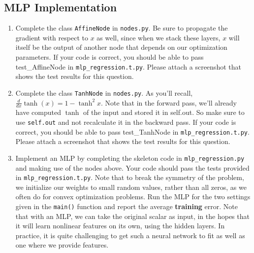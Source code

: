 \documentclass{article}
\theoremstyle{plain}
\theoremstyle{definition}
\begin{document}
\subsection{MLP Implementation}
\begin{enumerate}
\setcounter{enumi}{\value{saveenum}}
\item Complete the class \texttt{AffineNode} in \texttt{nodes.py}. Be sure
to propagate the gradient with respect to $x$ as well, since when
we stack these layers, $x$ will itself be the output of another node
that depends on our optimization parameters. If your code is correct, you should be able to pass test\_AffineNode in \texttt{mlp\_regression.t.py}. Please attach a screenshot that shows the test results for this question. 

\item Complete the class \texttt{TanhNode} in \texttt{nodes.py}. As you'll
recall, $\frac{d}{dx}\tanh(x)=1-\tanh^{2}x$. Note that in the forward
pass, we'll already have computed $\tanh$ of the input and stored
it in self.out. So make sure to use \texttt{self.out} and not recalculate
it in the backward pass. If your code is correct, you should be able to pass test\_TanhNode in \texttt{mlp\_regression.t.py}. Please attach a screenshot that shows the test results for this question. 

\item Implement an MLP by completing the skeleton code in \texttt{mlp\_regression.py}
and making use of the nodes above. Your code should pass the tests
provided in \texttt{mlp\_regression.t.py}. Note that to break the symmetry of the problem, we initialize our weights to small random values, rather than all zeros, as we often do for convex optimization problems. Run the MLP for the two settings given in the \texttt{main()} function and report the average \textbf{training} error. Note that with an MLP, we can take the original scalar as input, in the hopes that it will learn nonlinear features on its own, using the hidden layers. In practice, it is quite challenging to get such a neural network to fit as well as one where we provide features.
\setcounter{saveenum}{\value{enumi}}
\end{enumerate}
\end{document}

